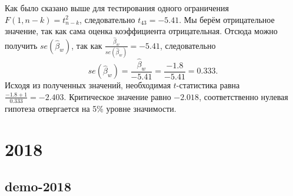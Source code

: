 \documentclass[addpoints, answers]{exam} %
\begin{document}
\begin{questions}
\begin{solution}
Как было сказано выше для тестирования одного ограничения $F(1,n-k)=t_{n-k}^{2} $, следовательно $t_{43} =-5.41$. Мы берём отрицательное значение, так как сама оценка коэффициента отрицательная. Отсюда можно получить $se(\hat{\beta }_{w} )$, так как $\frac{\hat{\beta }_{w} }{se(\hat{\beta }_{w} )} =-5.41$, следовательно
\[
se(\hat{\beta }_{w} )=\frac{\hat{\beta }_{w} }{-5.41} =\frac{-1.8}{-5.41} =0.333.
\]
Исходя из полученных значений, необходимая $t$-статистика равна $\frac{-1.8+1}{0.333} =-2.403$. Критическое значение равно  $-2.018$, соответственно нулевая гипотеза отвергается на 5\% уровне значимости.
\end{solution}




\end{questions}


\section{2018}

\subsection{demo-2018}
\end{document}

